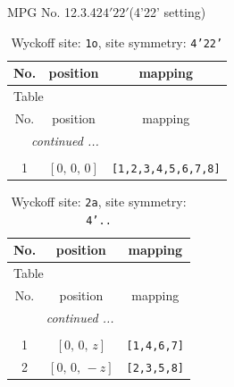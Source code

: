 \documentclass[fleqn,8pt]{jsarticle}
\begin{document}
\setcounter{MaxMatrixCols}{32}

\renewcommand{\tablename}{Table~}
\renewcommand{\figurename}{Figure~}
\begin{center}
\LARGE
MPG No. 12.3.42\quad$4'22'$\quad(4'22' setting)
\end{center}
\renewcommand{\arraystretch}{1.2}
\begin{longtable}{ccc}
\caption{Wyckoff site: {\tt 1o}, site symmetry: {\tt 4'22'}}
 \\
 \hline \hline
No. & position & mapping \\ \hline \endfirsthead

\multicolumn{2}{l}{\tablename\ \thetable{}} \\
 \hline \hline
No. & position & mapping \\ \hline \endhead

 \hline \hline
\multicolumn{2}{r}{\footnotesize\it continued ...} \\ \endfoot

 \hline \hline
\multicolumn{2}{r}{} \\ \endlastfoot

1 & $\left[ 0,\, 0,\, 0 \right]$ & {\tt [1,2,3,4,5,6,7,8]} \\
\end{longtable}
\renewcommand{\arraystretch}{1.2}
\begin{longtable}{ccc}
\caption{Wyckoff site: {\tt 2a}, site symmetry: {\tt 4'..}}
 \\
 \hline \hline
No. & position & mapping \\ \hline \endfirsthead

\multicolumn{2}{l}{\tablename\ \thetable{}} \\
 \hline \hline
No. & position & mapping \\ \hline \endhead

 \hline \hline
\multicolumn{2}{r}{\footnotesize\it continued ...} \\ \endfoot

 \hline \hline
\multicolumn{2}{r}{} \\ \endlastfoot

1 & $\left[ 0,\, 0,\, z \right]$ & {\tt [1,4,6,7]} \\ \hline
2 & $\left[ 0,\, 0,\, - z \right]$ & {\tt [2,3,5,8]} \\
\end{longtable}
\renewcommand{\arraystretch}{1.2}
\end{document}
